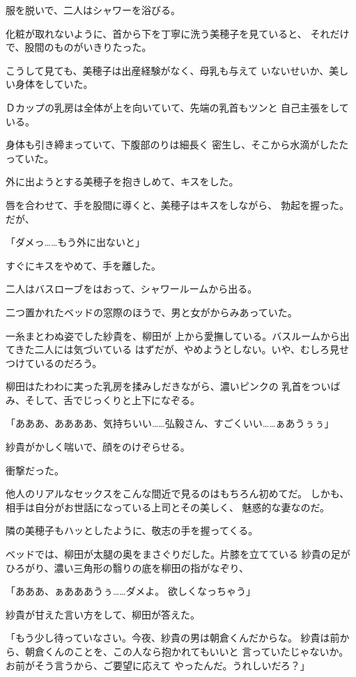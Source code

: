 ﻿\documentclass[
    book,tate,
    line_length=30zw,
    jafontsize=12pt,
    paper=b5j,
    landscape,
    ]{jlreq}
\begin{document}
服を脱いで、二人はシャワーを浴びる。

化粧が取れないように、首から下を丁寧に洗う美穂子を見ていると、
それだけで、股間のものがいきりたった。

こうして見ても、美穂子は出産経験がなく、母乳も与えて
いないせいか、美しい身体をしていた。

Ｄカップの乳房は全体が上を向いていて、先端の乳首もツンと
自己主張をしている。

身体も引き締まっていて、下腹部のりは細長く
密生し、そこから水滴がしたたっていた。

外に出ようとする美穂子を抱きしめて、キスをした。

唇を合わせて、手を股間に導くと、美穂子はキスをしながら、
勃起を握った。だが、

「ダメっ……もう外に出ないと」

すぐにキスをやめて、手を離した。

二人はバスローブをはおって、シャワールームから出る。

二つ置かれたベッドの窓際のほうで、男と女がからみあっていた。

一糸まとわぬ姿でした紗貴を、柳田が
上から愛撫している。バスルームから出てきた二人には気づいている
はずだが、やめようとしない。いや、むしろ見せつけているのだろう。

柳田はたわわに実った乳房を揉みしだきながら、濃いピンクの
乳首をついばみ、そして、舌でじっくりと上下になぞる。

「あああ、ああああ、気持ちいい……弘毅さん、すごくいい……ぁあうぅぅ」

紗貴がかしく喘いで、顔をのけぞらせる。

衝撃だった。

他人のリアルなセックスをこんな間近で見るのはもちろん初めてだ。
しかも、相手は自分がお世話になっている上司とその美しく、
魅惑的な妻なのだ。

隣の美穂子もハッとしたように、敬志の手を握ってくる。

ベッドでは、柳田が太腿の奥をまさぐりだした。片膝を立てている
紗貴の足がひろがり、濃い三角形の翳りの底を柳田の指がなぞり、

「あああ、ぁあああうぅ……ダメよ。 欲しくなっちゃう」

紗貴が甘えた言い方をして、柳田が答えた。

「もう少し待っていなさい。今夜、紗貴の男は朝倉くんだからな。
紗貴は前から、朝倉くんのことを、この人なら抱かれてもいいと
言っていたじゃないか。お前がそう言うから、ご要望に応えて
やったんだ。うれしいだろ？」
\end{document}

